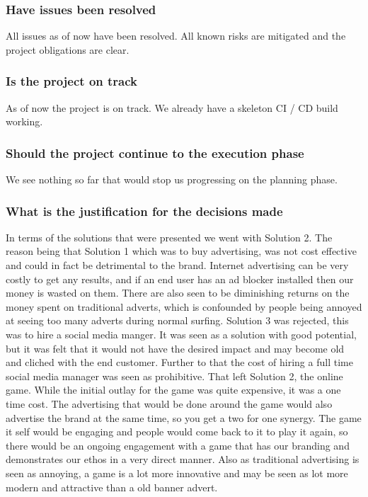 \documentclass{article}
\begin{document}
\subsubsection{Have issues been resolved}
All issues as of now have been resolved. All known risks are mitigated and the project obligations are clear.


\subsubsection{Is the project on track}
As of now the project is on track. We already have a skeleton CI / CD build working.

\subsubsection{Should the project continue to the execution phase}
We see nothing so far that would stop us progressing on the planning phase.

\subsubsection{What is the justification for the decisions made}
In terms of the solutions that were presented we went with Solution 2. The reason being that Solution 1 which was to buy advertising, was not cost effective and could in fact be detrimental to the brand. Internet advertising can be very costly to get any results, and if an end user has an ad blocker installed then our money is wasted on them. There are also seen to be diminishing returns on the money spent on traditional adverts, which is confounded by people being annoyed at seeing too many adverts during normal surfing.
Solution 3 was rejected, this was to hire a social media manger. It was seen as a solution with good potential, but it was felt that it would not have the desired impact and may become old and cliched with the end customer. Further to that the cost of hiring a full time social media manager was seen as prohibitive.
That left Solution 2, the online game. While the initial outlay for the game was quite expensive, it was a one time cost. The advertising that would be done around the game would also advertise the brand at the same time, so you get a two for one synergy. The game it self would be engaging and people would come back to it to play it again, so there would be an ongoing engagement with a game that has our branding and demonstrates our ethos in a very direct manner. Also as traditional advertising is seen as annoying, a game is a lot more innovative and may be seen as lot more modern and attractive than a old banner advert.
\end{document}

